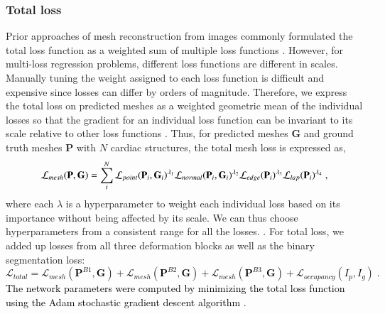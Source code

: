 \documentclass[times,review,preprint,authoryear]{elsarticle}
\begin{document}
\subsubsection{Total loss}
Prior approaches of mesh reconstruction from images commonly formulated the total loss function as a weighted sum of multiple loss functions \citep{Pixel2Mesh, Voxel2Mesh}. However, for multi-loss regression problems, different loss functions are different in scales. Manually tuning the weight assigned to each loss function is difficult and expensive since losses can differ by orders of magnitude. Therefore, we express the total loss on predicted meshes as a weighted geometric mean of the individual losses so that the gradient for an individual loss function can be invariant to its scale relative to other loss functions \textcolor{black}{ \citep{Chennupati_2019_CVPR_Workshops}}. Thus, for predicted meshes $\mathbf{G}$ and ground truth meshes $\mathbf{P}$ with $N$ cardiac structures, the total mesh loss is expressed as, 
\begin{equation}
    \label{eq:mesh_loss}
    \mathcal{L}_{mesh}(\mathbf{P}, \mathbf{G}) = \sum_i^N \mathcal{L}_{point} (\mathbf{P}_i, \mathbf{G}_i)^{\lambda_1}  \mathcal{L}_{normal} (\mathbf{P}_i, \mathbf{G}_i)^{\lambda_2} \textcolor{black}{\mathcal{L}_{edge}(\mathbf{P}_i)^{\lambda_3} }\mathcal{L}_{lap} (\mathbf{P}_i)^{\lambda_4} \;,
\end{equation}
where each $\lambda$ is a hyperparameter to weight each individual loss based on its importance without being affected by its scale. We can thus choose hyperparameters from a consistent range for all the losses. . For total loss, we added up losses from all three deformation blocks as well as the binary segmentation loss: 
\textcolor{black}{\begin{equation}
    \mathcal{L}_{total} = \mathcal{L}_{mesh}(\mathbf{P}^{B1}, \mathbf{G}) + \mathcal{L}_{mesh}(\mathbf{P}^{B2}, \mathbf{G}) + \mathcal{L}_{mesh}(\mathbf{P}^{B3}, \mathbf{G}) + \mathcal{L}_{occupancy}(I_p, I_g) \; .
\end{equation}}
\textcolor{black}{The network parameters were computed by minimizing the total loss function using the Adam stochastic gradient descent algorithm \citep{adam}.} 
\end{document}
